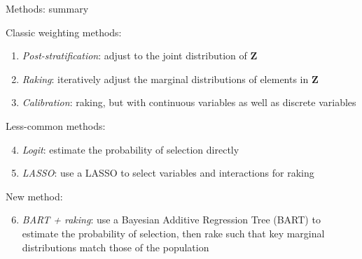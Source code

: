 \documentclass[
  ignorenonframetext,
]{beamer}
\providecommand{\tightlist}{%
  \setlength{\itemsep}{0pt}\setlength{\parskip}{0pt}}
\begin{document}
\begin{frame}{Methods: summary}
\protect\hypertarget{methods-summary}{}

Classic weighting methods:

\begin{enumerate}
\tightlist
\item
  \emph{Post-stratification}: adjust to the joint distribution of
  \(\mathbf{Z}\)
\item
  \emph{Raking}: iteratively adjust the marginal distributions of
  elements in \(\mathbf{Z}\)
\item
  \emph{Calibration}: raking, but with continuous variables as well as
  discrete variables
\end{enumerate}

Less-common methods:

\begin{enumerate}
\setcounter{enumi}{3}
\tightlist
\item
  \emph{Logit}: estimate the probability of selection directly
\item
  \emph{LASSO}: use a LASSO to select variables and interactions for
  raking
\end{enumerate}

New method:

\begin{enumerate}
\setcounter{enumi}{5}
\tightlist
\item
  \emph{BART + raking}: use a Bayesian Additive Regression Tree (BART)
  to estimate the probability of selection, then rake such that key
  marginal distributions match those of the population
\end{enumerate}

\end{frame}
\end{document}

